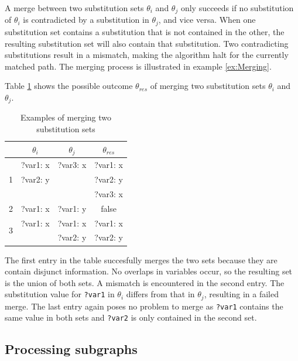 A merge between two substitution sets $\theta_i$ and $\theta_j$ only succeeds if no substitution of $\theta_i$ is contradicted by a substitution in $\theta_j$, and vice versa. When one substitution set contains a substitution that is not contained in the other, the resulting substitution set will also contain that substitution. Two contradicting substitutions result in a mismatch, making the algorithm halt for the currently matched path. The merging process is illustrated in example \ref{ex:Merging}.
\begin{exmp}
\label{ex:Merging}
Table \ref{tab:merging} shows the possible outcome $\theta_{res}$ of merging two substitution sets $\theta_{i}$ and $\theta_{j}$.

\begin{table}[!h]
\centering
  \begin{tabular}{| c | c | c | c |}
  \hline
   & $\theta_i$ & $\theta_j$ & $\theta_{res}$\\
  \hline \hline
  \multirow{3}{*}{1} & ?var1: x & ?var3: x & ?var1: x\\
    & ?var2: y &  & ?var2: y\\
    & & & ?var3: x\\
  \hline
  2 & ?var1: x & ?var1: y & false\\
  \hline
   \multirow{2}{*}{3} & ?var1: x & ?var1: x & ?var1: x\\
  & & ?var2: y & ?var2: y \\
  \hline

  \end{tabular}
  
  \caption{Examples of merging two substitution sets}
  \label{tab:merging}
\end{table}

 The first entry in the table succesfully merges the two sets because they are contain disjunct information. No overlaps in variables occur, so the resulting set is the union of both sets. A mismatch is encountered in the second entry. The substitution value for \texttt{?var1} in $\theta_i$ differs from that in $\theta_j$, resulting in a failed merge. The last entry again poses no problem to merge as \texttt{?var1} contains the same value in both sets and \texttt{?var2} is only contained in the second set.

\end{exmp}
\subsection{Processing subgraphs}
\label{subsec:subgraphs}

